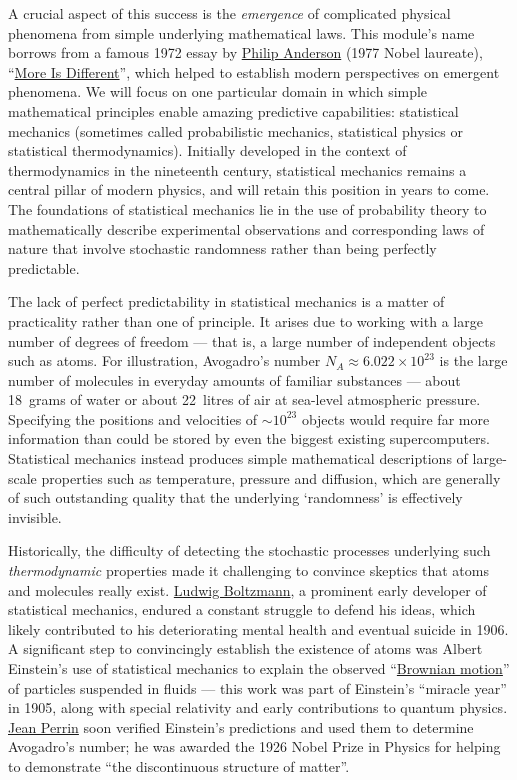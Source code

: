 A crucial aspect of this success is the \textit{emergence} of complicated physical phenomena from simple underlying mathematical laws.
This module's name borrows from a famous 1972 essay by \href{https://en.wikipedia.org/wiki/Philip_W._Anderson}{Philip Anderson} (1977 Nobel laureate), ``\href{https://doi.org/10.1126/science.177.4047.393}{More Is Different}'', which helped to establish modern perspectives on emergent phenomena.
We will focus on one particular domain in which simple mathematical principles enable amazing predictive capabilities: statistical mechanics (sometimes called probabilistic mechanics, statistical physics or statistical thermodynamics).
Initially developed in the context of thermodynamics in the nineteenth century, statistical mechanics remains a central pillar of modern physics, and will retain this position in years to come.
The foundations of statistical mechanics lie in the use of probability theory to mathematically describe experimental observations and corresponding laws of nature that involve stochastic randomness rather than being perfectly predictable.

The lack of perfect predictability in statistical mechanics is a matter of practicality rather than one of principle.
It arises due to working with a large number of degrees of freedom --- that is, a large number of independent objects such as atoms.
For illustration, Avogadro's number $N_A \approx 6.022\times 10^{23}$ is the large number of molecules in everyday amounts of familiar substances --- about 18~grams of water or about 22~litres of air at sea-level atmospheric pressure. %
Specifying the positions and velocities of $\sim$$10^{23}$ objects would require far more information than could be stored by even the biggest existing supercomputers.
Statistical mechanics instead produces simple mathematical descriptions of large-scale properties such as temperature, pressure and diffusion, which are generally of such outstanding quality that the underlying `randomness' is effectively invisible.

Historically, the difficulty of detecting the stochastic processes underlying such \textit{thermodynamic} properties made it challenging to convince skeptics that atoms and molecules really exist.
\href{https://en.wikipedia.org/wiki/Ludwig_Boltzmann}{Ludwig Boltzmann}, a prominent early developer of statistical mechanics, endured a constant struggle to defend his ideas, which likely contributed to his deteriorating mental health and eventual suicide in 1906.
A significant step to convincingly establish the existence of atoms was Albert Einstein's use of statistical mechanics to explain the observed ``\href{https://en.wikipedia.org/wiki/Brownian_motion}{Brownian motion}'' of particles suspended in fluids --- this work was part of Einstein's ``miracle year'' in 1905, along with special relativity and early contributions to quantum physics.
\href{https://en.wikipedia.org/wiki/Jean_Baptiste_Perrin}{Jean Perrin} soon verified Einstein's predictions and used them to determine Avogadro's number; he was awarded the 1926 Nobel Prize in Physics for helping to demonstrate ``the discontinuous structure of matter''.

